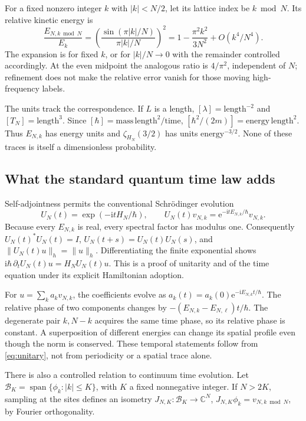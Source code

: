 \documentclass[11pt,a4paper]{article}
\theoremstyle{definition}\newtheorem{definition}[theorem]{Definition}
\theoremstyle{remark}\newtheorem{remark}[theorem]{Remark}
\newcommand{\C}{\mathbb C}\newcommand{\R}{\mathbb R}\newcommand{\Z}{\mathbb Z}
\newcommand{\ee}{\mathrm e}\newcommand{\ii}{\mathrm i}
\numberwithin{equation}{section}
\begin{document}
For a fixed nonzero integer \(k\) with \(|k|<N/2\), let its lattice index
be \(k\bmod N\). Its relative kinetic energy is
\begin{equation}
 \frac{E_{N,k\bmod N}}{E_k}
 =\left(\frac{\sin(\pi |k|/N)}{\pi |k|/N}\right)^2
 =1-\frac{\pi^2k^2}{3N^2}+O(k^4/N^4).
 \label{eq:dispersion}
\end{equation}
The expansion is for fixed \(k\), or for \(|k|/N\to0\) with the remainder
controlled accordingly. At the even midpoint the analogous ratio is
\(4/\pi^2\), independent of \(N\); refinement does not make the relative
error vanish for those moving high-frequency labels.

The units track the correspondence. If \(L\) is a length,
\([\lambda]=\mathrm{length}^{-2}\) and
\([T_N]=\mathrm{length}^3\).
Since \([\hbar]=\mathrm{mass}\,\mathrm{length}^2/\mathrm{time}\),
\([\hbar^2/(2m)]=\mathrm{energy}\,\mathrm{length}^2\).
Thus \(E_{N,k}\) has energy units and \(\zeta_{H_N}(3/2)\) has
units \(\mathrm{energy}^{-3/2}\). None of these traces is itself a
dimensionless probability.

\subsection{What the standard quantum time law adds}
Self-adjointness permits the conventional Schr\"odinger evolution
\begin{equation}
 U_N(t)=\exp(-\ii tH_N/\hbar),\qquad
 U_N(t)v_{N,k}=\ee^{-\ii tE_{N,k}/\hbar}v_{N,k}.
 \label{eq:unitary}
\end{equation}
Because every \(E_{N,k}\) is real, every spectral factor has modulus one.
Consequently \(U_N(t)^*U_N(t)=I\),
\(U_N(t+s)=U_N(t)U_N(s)\), and
\(\|U_N(t)u\|_h=\|u\|_h\).
Differentiating the finite exponential shows
\(\ii\hbar\,\partial_t U_N(t)u=H_NU_N(t)u\).
This is a proof of unitarity and of the time equation under its explicit
Hamiltonian adoption.

For \(u=\sum_k a_kv_{N,k}\), the coefficients evolve as
\(a_k(t)=a_k(0)\ee^{-\ii E_{N,k}t/\hbar}\).
The relative phase of two components changes by
\(-(E_{N,k}-E_{N,\ell})t/\hbar\).
The degenerate pair \(k,N-k\) acquires the same time phase, so its relative
phase is constant. A superposition of different energies can change its
spatial profile even though the norm is conserved.
These temporal statements follow from \eqref{eq:unitary}, not from
periodicity or a spatial trace alone.

There is also a controlled relation to continuum time evolution.
Let \(\mathcal B_K=\operatorname{span}\{\phi_k:|k|\leq K\}\), with \(K\)
a fixed nonnegative integer. If \(N>2K\), sampling at the sites defines an
isometry \(J_{N,K}:\mathcal B_K\to\C^N\),
\(J_{N,K}\phi_k=v_{N,k\bmod N}\), by Fourier orthogonality.
\end{document}
